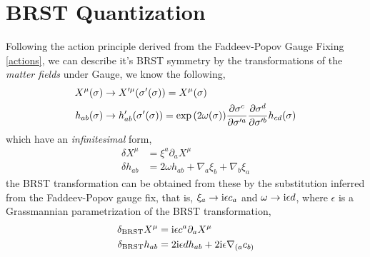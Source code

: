 \section{BRST Quantization}

Following the action principle derived from the Faddeev-Popov Gauge Fixing \ref{actions}, we can describe it's BRST symmetry by 
the transformations of the \textit{matter fields} under Gauge, we know the following,
\begin{align*}
    X^\mu\qty(\sigma)&\rightarrow X'^\mu\qty(\sigma'\qty(\sigma))=X^\mu\qty(\sigma)\\
    h_{ab}\qty(\sigma)&\rightarrow h'_{ab}\qty(\sigma'\qty(\sigma))=\exp\qty(2\omega\qty(\sigma))\pdv{\sigma^c}{\sigma'^a}\pdv{\sigma^d}{\sigma'^b}h_{cd}\qty(\sigma)
\end{align*}
which have an \textit{infinitesimal} form,
\begin{align*}
    \delta X^\mu&=\xi^a\partial_a X^\mu\\
    \delta h_{ab}&=2\omega h_{ab}+\nabla_a\xi_b+\nabla_b\xi_a
\end{align*}
the BRST transformation can be obtained from these by the substitution inferred from the Faddeev-Popov gauge fix, that is, $\xi_a\rightarrow \textnormal{i}\epsilon c_a$ and 
$\omega\rightarrow \textnormal{i} \epsilon d$, where $\epsilon$ is a Grassmannian parametrization of the BRST transformation,
\begin{align*}
    \delta_{\textnormal{BRST}} X^\mu&=\textnormal{i}\epsilon c^a\partial_a X^\mu\\
    \delta_{\textnormal{BRST}} h_{ab}&=2\textnormal{i}\epsilon d h_{ab}+2\textnormal{i}\epsilon\nabla_{(a} c_{b)}
\end{align*}

